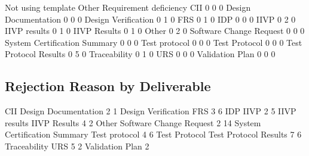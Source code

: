 \documentclass{article}
\begin{document}
\begin{Schunk}
\begin{Soutput}
                               Not using template Other Requirement deficiency
  CII                                           0     0                      0
  Design Documentation                          0     0                      0
  Design Verification                           0     1                      0
  FRS                                           0     1                      0
  IDP                                           0     0                      0
  IIVP                                          0     2                      0
  IIVP results                                  0     1                      0
  IIVP Results                                  0     1                      0
  Other                                         0     2                      0
  Software Change Request                       0     0                      0
  System Certification Summary                  0     0                      0
  Test protocol                                 0     0                      0
  Test Protocol                                 0     0                      0
  Test Protocol Results                         0     5                      0
  Traceability                                  0     1                      0
  URS                                           0     0                      0
  Validation Plan                               0     0                      0
\end{Soutput}
\end{Schunk}


\subsection{Rejection Reason by Deliverable}

\begin{Schunk}
\begin{Soutput}
                         CII         Design Documentation 
                           2                            1 
         Design Verification                          FRS 
                           3                            6 
                         IDP                         IIVP 
                           2                            5 
                IIVP results                 IIVP Results 
                           4                            2 
                       Other      Software Change Request 
                           2                           14 
System Certification Summary                Test protocol 
                           4                            6 
               Test Protocol        Test Protocol Results 
                           7                            6 
                Traceability                          URS 
                           5                            2 
             Validation Plan 
                           2 
\end{Soutput}
\end{Schunk}
\end{document}
